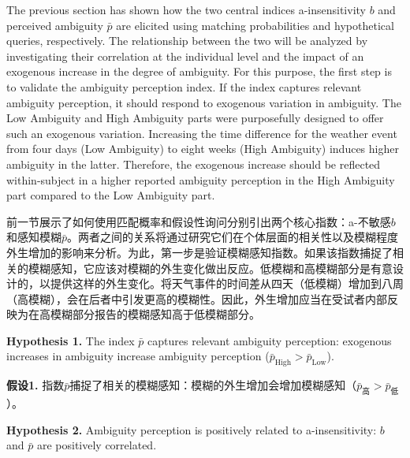 \documentclass[12pt,a4paper]{article}
\newenvironment{original}
  {\par\medskip\noindent\color{black}\ignorespaces}
  {\par\medskip}
\newenvironment{translation}
  {\par\noindent\color{transblue}\ignorespaces}
  {\par\medskip\medskip}
\begin{document}
\begin{original}
The previous section has shown how the two central indices a-insensitivity $b$ and perceived ambiguity $\bar{p}$ are elicited using matching probabilities and hypothetical queries, respectively. The relationship between the two will be analyzed by investigating their correlation at the individual level and the impact of an exogenous increase in the degree of ambiguity. For this purpose, the first step is to validate the ambiguity perception index. If the index captures relevant ambiguity perception, it should respond to exogenous variation in ambiguity. The Low Ambiguity and High Ambiguity parts were purposefully designed to offer such an exogenous variation. Increasing the time difference for the weather event from four days (Low Ambiguity) to eight weeks (High Ambiguity) induces higher ambiguity in the latter. Therefore, the exogenous increase should be reflected within-subject in a higher reported ambiguity perception in the High Ambiguity part compared to the Low Ambiguity part.
\end{original}

\begin{translation}
前一节展示了如何使用匹配概率和假设性询问分别引出两个核心指数：a-不敏感$b$和感知模糊$\bar{p}$。两者之间的关系将通过研究它们在个体层面的相关性以及模糊程度外生增加的影响来分析。为此，第一步是验证模糊感知指数。如果该指数捕捉了相关的模糊感知，它应该对模糊的外生变化做出反应。低模糊和高模糊部分是有意设计的，以提供这样的外生变化。将天气事件的时间差从四天（低模糊）增加到八周（高模糊），会在后者中引发更高的模糊性。因此，外生增加应当在受试者内部反映为在高模糊部分报告的模糊感知高于低模糊部分。
\end{translation}

\begin{original}
\textbf{Hypothesis 1.} The index $\bar{p}$ captures relevant ambiguity perception: exogenous increases in ambiguity increase ambiguity perception ($\bar{p}_{\text{High}} > \bar{p}_{\text{Low}}$).
\end{original}

\begin{translation}
\textbf{假设1.} 指数$\bar{p}$捕捉了相关的模糊感知：模糊的外生增加会增加模糊感知（$\bar{p}_{\text{高}} > \bar{p}_{\text{低}}$）。
\end{translation}

\begin{original}
\textbf{Hypothesis 2.} Ambiguity perception is positively related to a-insensitivity: $b$ and $\bar{p}$ are positively correlated.
\end{original}
\end{document}
